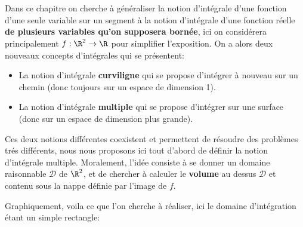 \chapter*{}
Dans ce chapitre on cherche à généraliser la notion d'intégrale d'une fonction d'une seule variable sur un segment à la notion d'intégrale d'une fonction réelle \textbf{de plusieurs variables qu'on supposera bornée}, ici on considérera principalement \(f : \R^2 \rightarrow \R\) pour simplifier l'exposition. On a alors deux nouveaux concepts d'intégrales qui se présentent:
\begin{itemize}
   \item La notion d'intégrale \textbf{curviligne} qui se propose d'intégrer à nouveau sur un chemin (donc toujours sur un espace de dimension 1).
   \item La notion d'intégrale \textbf{multiple} qui se propose d'intégrer sur une surface (donc sur un espace de dimension plus grande).
\end{itemize}
Ces deux notions différentes coexistent et permettent de résoudre des problèmes trés différents, nous nous proposons ici tout d'abord de définir la notion d'intégrale multiple. Moralement, l'idée consiste à se donner un domaine raisonnable \(\mathcal{D}\) de \(\R^2\), et de chercher à calculer le \textbf{volume} au dessus \(\mathcal{D}\) et contenu sous la nappe définie par l'image de \(f\). 

Graphiquement, voila ce que l'on cherche à réaliser, ici le domaine d'intégration étant un simple rectangle:
\begin{center}
\end{center}

